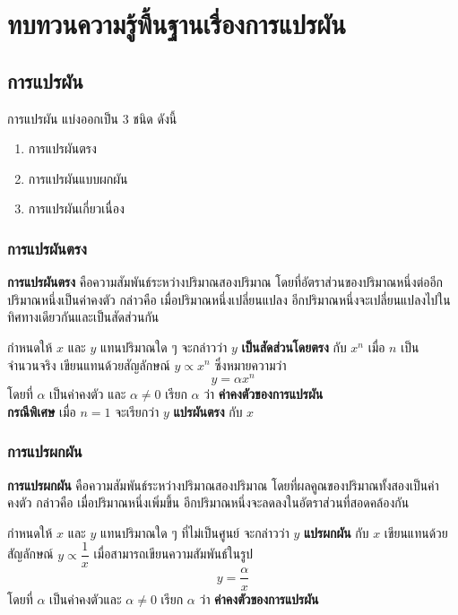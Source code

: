 \chapter{ทบทวนความรู้พื้นฐานเรื่องการแปรผัน}
\section{การแปรผัน}
การแปรผัน แบ่งออกเป็น 3 ชนิด ดังนี้
\begin{enumerate}
\item การแปรผันตรง
\item การแปรผันแบบผกผัน
\item การแปรผันเกี่ยวเนื่อง
\end{enumerate} 

\subsection{การแปรผันตรง}
\textbf{การแปรผันตรง} คือความสัมพันธ์ระหว่างปริมาณสองปริมาณ โดยที่อัตราส่วนของปริมาณหนึ่งต่ออีกปริมาณหนึ่งเป็นค่าคงตัว กล่าวคือ เมื่อปริมาณหนึ่งเปลี่ยนแปลง อีกปริมาณหนึ่งจะเปลี่ยนแปลงไปในทิศทางเดียวกันและเป็นสัดส่วนกัน  

\begin{definitionbox}\label{definition1.1}
กำหนดให้ $x$ และ $y$ แทนปริมาณใด ๆ  
จะกล่าวว่า $y$ \textbf{เป็นสัดส่วนโดยตรง} กับ $x^n$ เมื่อ $n$ เป็นจำนวนจริง  
เขียนแทนด้วยสัญลักษณ์ $y \propto x^n$  
ซึ่งหมายความว่า
\[
y = \alpha x^n
\]
โดยที่ $\alpha$ เป็นค่าคงตัว และ $\alpha \neq 0$ เรียก $\alpha$ ว่า \textbf{ค่าคงตัวของการแปรผัน}\\
\medskip
\textbf{กรณีพิเศษ} เมื่อ $n=1$ จะเรียกว่า $y$ \textbf{แปรผันตรง} กับ $x$
\end{definitionbox}

\newpage
\subsection{การแปรผกผัน}
\textbf{การแปรผกผัน} คือความสัมพันธ์ระหว่างปริมาณสองปริมาณ โดยที่ผลคูณของปริมาณทั้งสองเป็นค่าคงตัว กล่าวคือ เมื่อปริมาณหนึ่งเพิ่มขึ้น อีกปริมาณหนึ่งจะลดลงในอัตราส่วนที่สอดคล้องกัน  

\begin{definitionbox}\label{definition1.2}
กำหนดให้ $x$ และ $y$ แทนปริมาณใด ๆ ที่ไม่เป็นศูนย์  
จะกล่าวว่า $y$ \textbf{แปรผกผัน} กับ $x$ เขียนแทนด้วยสัญลักษณ์ $y \propto \dfrac{1}{x}$  
เมื่อสามารถเขียนความสัมพันธ์ในรูป
\[
y = \frac{\alpha}{x}
\]
โดยที่ $\alpha$ เป็นค่าคงตัวและ $\alpha \neq 0$ เรียก $\alpha$ ว่า \textbf{ค่าคงตัวของการแปรผัน}
\end{definitionbox}


